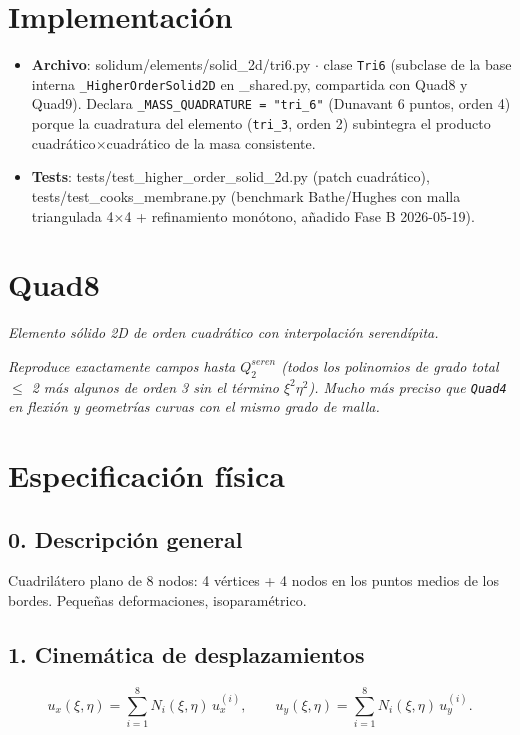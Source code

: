 \documentclass[11pt,letterpaper,oneside]{report}
\begin{document}
\section{Implementación}

\begin{itemize}
  \item \textbf{Archivo}: solidum/elements/solid\_2d/tri6.py \ensuremath{\cdot} clase \texttt{Tri6} (subclase de la base interna \texttt{\_HigherOrderSolid2D} en \_shared.py, compartida con Quad8 y Quad9). Declara \texttt{\_MASS\_QUADRATURE = "tri\_6"} (Dunavant 6 puntos, orden 4) porque la cuadratura del elemento (\texttt{tri\_3}, orden 2) subintegra el producto cuadrático\ensuremath{\times}cuadrático de la masa consistente.
  \item \textbf{Tests}: tests/test\_higher\_order\_solid\_2d.py (patch cuadrático), tests/test\_cooks\_membrane.py (benchmark Bathe/Hughes con malla triangulada 4\ensuremath{\times}4 + refinamiento monótono, añadido Fase B 2026-05-19).
\end{itemize}


\newpage

\section{Quad8}



\textit{Elemento sólido 2D de orden cuadrático con interpolación serendípita.}

\textit{Reproduce exactamente campos hasta $Q_2^{seren}$ (todos los polinomios de grado total \ensuremath{\le} 2 más algunos de orden 3 sin el término $\xi^2\eta^2$). Mucho más preciso que \texttt{Quad4} en flexión y geometrías curvas con el mismo grado de malla.}



\section{Especificación física}

\subsection{0. Descripción general}
Cuadrilátero plano de 8 nodos: 4 vértices + 4 nodos en los puntos medios de los bordes. Pequeñas deformaciones, isoparamétrico.

\subsection{1. Cinemática de desplazamientos}
\[
u_x(\xi, \eta) = \sum_{i=1}^{8} N_i(\xi, \eta)\, u_x^{(i)}, \qquad u_y(\xi, \eta) = \sum_{i=1}^{8} N_i(\xi, \eta)\, u_y^{(i)}.
\]
\end{document}

